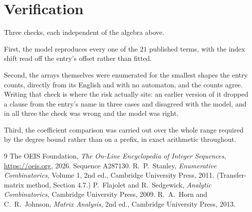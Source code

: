 \documentclass[11pt,a4paper]{article}
\theoremstyle{plain}
\theoremstyle{definition}
\begin{document}
\section{Verification}

Three checks, each independent of the algebra above.

First, the model reproduces every one of the $21$ published terms, with the index shift
read off the entry's offset rather than fitted.

Second, the arrays themselves were enumerated for the smallest shapes the entry counts,
directly from its English and with no automaton, and the counts agree. Writing that check is
where the risk actually sits: an earlier version of it dropped a clause from the entry's name
in three cases and disagreed with the model, and in all three the check was wrong and the model
was right.

Third, the coefficient comparison was carried out over the whole range required by the degree
bound rather than on a prefix, in exact arithmetic throughout.

\begin{thebibliography}{9}
 The OEIS Foundation, \emph{The On-Line Encyclopedia of Integer
Sequences}, \url{https://oeis.org}, 2026. Sequence A287130.
 R.~P.~Stanley, \emph{Enumerative Combinatorics}, Volume 1, 2nd ed.,
Cambridge University Press, 2011. (Transfer-matrix method, Section 4.7.)
 P.~Flajolet and R.~Sedgewick, \emph{Analytic Combinatorics}, Cambridge
University Press, 2009.
 R.~A.~Horn and C.~R.~Johnson, \emph{Matrix Analysis}, 2nd ed., Cambridge
University Press, 2013.
\end{thebibliography}
\end{document}
